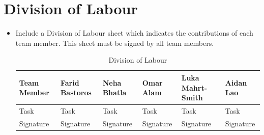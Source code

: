 \documentclass[]{article}
\begin{document}
\clearpage
\appendix
\section{Division of Labour}
\label{sec:division_of_labour}
\begin{itemize}
	\item Include a Division of Labour sheet which indicates the contributions of each team member. This sheet must be signed by all team members.
	\begin{table}[ht]
		\centering
		\begin{tabular}{| l | l | l | l | l | l |}
		\hline
		\textbf{Team Member} &\textbf{Farid Bastoros} & \textbf{Neha Bhatla} & \textbf{Omar Alam} & \textbf{Luka Mahrt-Smith} & \textbf{Aidan Lao} \\
		\hline
		Task & Task & Task & Task & Task & Task \\
		\hline
		Signature & Signature & Signature & Signature & Signature & Signature\\
		\hline
		\end{tabular}
		\caption{Division of Labour}
	\end{table}
\end{itemize}
\end{document}
